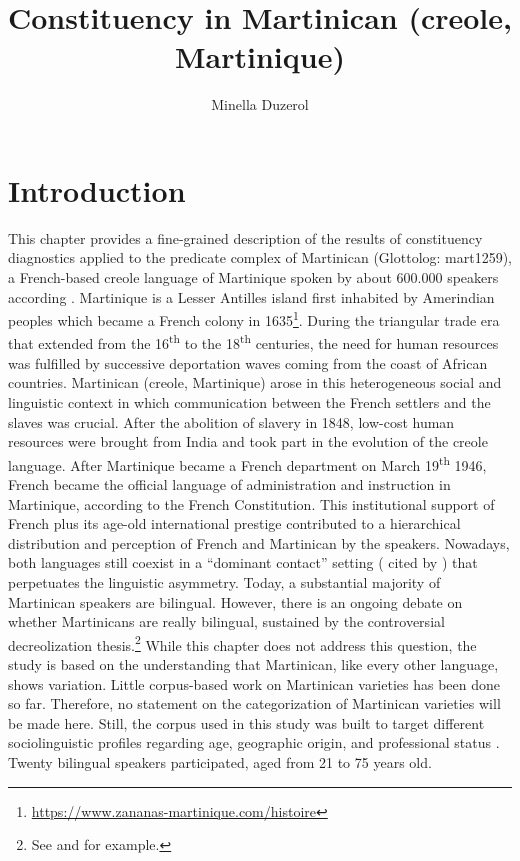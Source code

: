 \documentclass[output=paper]{langscibook}
\author{Minella Duzerol\affiliation{CNRS-DDL}}
\title{Constituency in Martinican (creole, Martinique)}
\begin{document}
\maketitle 

\section{Introduction}

This chapter provides a fine-grained description of the results of constituency diagnostics applied to the predicate complex of Martinican (Glottolog: mart1259), a French-based creole language of Martinique spoken by about 600.000 speakers according \citet{Colot2013}. Martinique is a Lesser Antilles island first inhabited by Amerindian peoples which became a French colony in 1635\footnote{\url{https://www.zananas-martinique.com/histoire}}. During the triangular trade era that extended from the 16\textsuperscript{th} to the 18\textsuperscript{th} centuries, the need for human resources was fulfilled by successive deportation waves coming from the coast of African countries. Martinican (creole, Martinique) arose in this heterogeneous social and linguistic context in which communication between the French settlers and the slaves was crucial. After the abolition of slavery in 1848, low-cost human resources were brought from India and took part in the evolution of the creole language. After Martinique became a French department on March 19\textsuperscript{th} 1946, French became the official language of administration and instruction in Martinique, according to the French Constitution. This institutional support of French plus its age-old international prestige contributed to a hierarchical distribution and perception of French and Martinican by the speakers. Nowadays, both languages still coexist in a ``dominant contact'' setting (\citealt{GadetPfaender2009} cited by \citealt{Colot2013}) that perpetuates the linguistic asymmetry. Today, a substantial majority of Martinican speakers are bilingual. However, there is an ongoing debate on whether Martinicans are really bilingual, sustained by the controversial decreolization thesis.\footnote{See \citet{Siegel2010} and \citet{Degraff2005} for example.} While this chapter does not address this question, the study is based on the understanding that Martinican, like every other language, shows variation. Little corpus-based work on Martinican varieties has been done so far. Therefore, no statement on the categorization of Martinican varieties will be made here. Still, the corpus used in this study was built to target different sociolinguistic profiles regarding age, geographic origin, and professional status%
. Twenty bilingual speakers participated, aged from 21 to 75 years old.
\end{document}
